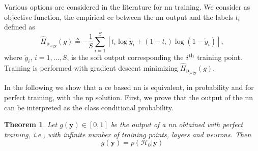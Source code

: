 \documentclass[conference,draftcls,onecolumn]{IEEEtran}
\newcommand{\hatcross}[2]{\hat{H}_{#1}(#2)}
\newcommand{\gy}{g(\bm y)}
\newtheorem{theorem}{Theorem}
\begin{document}
Various options are considered in the literature for \ac{nn} training. We consider as objective function, the empirical \ac{ce} between the \ac{nn} output and the labels $t_i$ defined as
\begin{equation}\label{eq:ce}
\hatcross{\bm p_{\mathcal{H}|\bm y}}{g} \triangleq -\frac{1}{S} \sum_{i=1}^{S}\left[t_i\log \tilde{y}_i +\left(1-t_i\right)\log\left(1-\tilde{y}_i\right)\right],
\end{equation}
where $\tilde{y}_i$, $i=1, \ldots, S$, is the soft output corresponding the $i^{\rm th}$  training point. Training is performed with gradient descent minimizing $\hatcross{\bm p_{\mathcal{H}|\bm y}}{g}$.

In the following we show that a \ac{ce} based \ac{nn} is equivalent, in probability and for perfect training, with the \ac{np} solution. First, we prove that the output of the \ac{nn} can be interpreted as the class conditional probability. 
\begin{theorem}
Let $\gy \in [0,1]$ be the output of a \ac{nn} obtained with perfect training, i.e., with infinite number of training points, layers and neurons. Then
\begin{equation}
	\gy = p(\mathcal{H}_0|\bm y)	
\end{equation}
\end{theorem}
\end{document}
